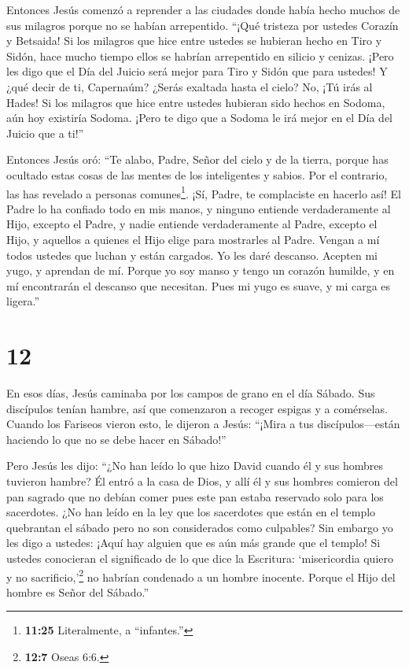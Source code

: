  Entonces Jesús comenzó a reprender a las ciudades donde
había hecho muchos de sus milagros porque no se habían arrepentido.
 ``¡Qué tristeza por ustedes Corazín y Betsaida! Si los
milagros que hice entre ustedes se hubieran hecho en Tiro y Sidón, hace
mucho tiempo ellos se habrían arrepentido en silicio y cenizas.
 ¡Pero les digo que el Día del Juicio será mejor para Tiro
y Sidón que para ustedes!  Y ¿qué decir de ti, Capernaúm?
¿Serás exaltada hasta el cielo? No, ¡Tú irás al Hades! Si los milagros
que hice entre ustedes hubieran sido hechos en Sodoma, aún hoy existiría
Sodoma.  ¡Pero te digo que a Sodoma le irá mejor en el Día
del Juicio que a ti!''

 Entonces Jesús oró: ``Te alabo, Padre, Señor del cielo y
de la tierra, porque has ocultado estas cosas de las mentes de los
inteligentes y sabios. Por el contrario, las has revelado a personas
comunes\footnote{\textbf{11:25} Literalmente, a ``infantes.''}.
 ¡Sí, Padre, te complaciste en hacerlo así! 
El Padre lo ha confiado todo en mis manos, y ninguno entiende
verdaderamente al Hijo, excepto el Padre, y nadie entiende
verdaderamente al Padre, excepto el Hijo, y aquellos a quienes el Hijo
elige para mostrarles al Padre.  Vengan a mí todos ustedes
que luchan y están cargados. Yo les daré descanso.  Acepten
mi yugo, y aprendan de mí. Porque yo soy manso y tengo un corazón
humilde, y en mí encontrarán el descanso que necesitan. 
Pues mi yugo es suave, y mi carga es ligera.''

\hypertarget{section-11}{%
\section{12}\label{section-11}}

 En esos días, Jesús caminaba por los campos de grano en el
día Sábado. Sus discípulos tenían hambre, así que comenzaron a recoger
espigas y a comérselas.  Cuando los Fariseos vieron esto, le
dijeron a Jesús: ``¡Mira a tus discípulos---están haciendo lo que no se
debe hacer en Sábado!''

 Pero Jesús les dijo: ``¿No han leído lo que hizo David
cuando él y sus hombres tuvieron hambre?  Él entró a la casa
de Dios, y allí él y sus hombres comieron del pan sagrado que no debían
comer pues este pan estaba reservado solo para los sacerdotes.
 ¿No han leído en la ley que los sacerdotes que están en el
templo quebrantan el sábado pero no son considerados como culpables?
 Sin embargo yo les digo a ustedes: ¡Aquí hay alguien que es
aún más grande que el templo!  Si ustedes conocieran el
significado de lo que dice la Escritura: `misericordia quiero y no
sacrificio,'\footnote{\textbf{12:7} Oseas 6:6.} no habrían condenado a
un hombre inocente.  Porque el Hijo del hombre es Señor del
Sábado.''

